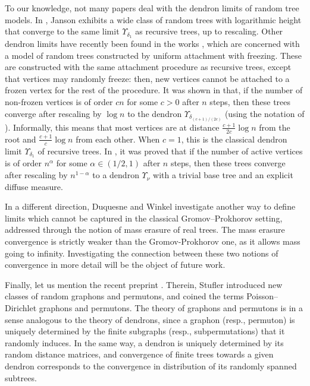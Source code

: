 \documentclass{article}
\theoremstyle{remark}
\begin{document}
To our knowledge, not many papers deal with the dendron limits of random tree models.
In \cite{Janson21}, Janson exhibits a wide class of random trees with logarithmic height that converge to the same limit $\Upsilon_{\delta_1}$ as recursive trees, up to rescaling.
Other dendron limits have recently been found in the works \cite{Bellin_Blanc-Renaudie_Kammerer_Kortchemski_2025,Bellin_Blanc-Renaudie_Kammerer_Kortchemski_2025_scaling}, which are concerned with a model of random trees constructed by uniform attachment with freezing. 
These are constructed with the same attachment procedure as recursive trees, except that vertices may randomly freeze:
then, new vertices cannot be attached to a frozen vertex for the rest of the procedure.
It was shown in \cite{Bellin_Blanc-Renaudie_Kammerer_Kortchemski_2025} that, if the number of non-frozen vertices is of order $cn$ for some $c>0$ after $n$ steps, then these trees converge after rescaling by $\log n$ to the dendron $\Upsilon_{\delta_{(c+1)/(2c)}}$ (using the notation of \cite{Janson21}).
Informally, this means that most vertices are at distance $\frac{c+1}{2c} \log n$ from the root and $\frac{c+1}{c} \log n$ from each other.
When $c=1$, this is the classical dendron limit $\Upsilon_{\delta_1}$ of recursive trees.
In \cite{Bellin_Blanc-Renaudie_Kammerer_Kortchemski_2025_scaling}, it was proved that if the number of active vertices is of order $n^\alpha$ for some $\alpha\in(1/2,1)$ after $n$ steps, then these trees converge after rescaling by $n^{1-\alpha}$ to a dendron $\Upsilon_\nu$ with a trivial base tree and an explicit diffuse measure.
\medskip

In a different direction, Duquesne and Winkel \cite{DuquesneWinkel2026} investigate another way to define limits which cannot be captured in the classical Gromov–Prokhorov setting, addressed through the notion of mass erasure of real trees. The mass erasure convergence is strictly weaker than the Gromov-Prokhorov one, as it allows mass going to infinity. Investigating the connection between these two notions of convergence in more detail will be the object of future work.
\medskip

Finally, let us mention the recent preprint \cite{stufler2026poissondirichletgraphonspermutons}.
Therein, Stufler introduced new classes of random graphons and permutons, and coined the terms Poisson--Dirichlet graphons and permutons.
The theory of graphons and permutons is in a sense analogous to the theory of dendrons, since a graphon (resp., permuton) is uniquely determined by the finite subgraphs (resp., subpermutations) that it randomly induces.
In the same way, a dendron is uniquely determined by its random distance matrices, and convergence of finite trees towards a given dendron corresponds to the convergence in distribution of its randomly spanned subtrees.
\end{document}
